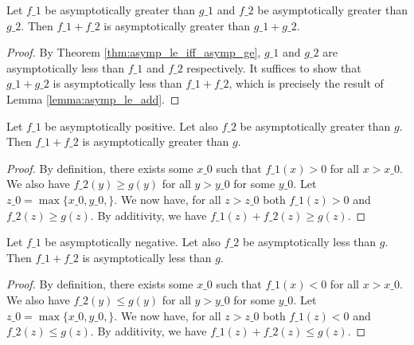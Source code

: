 \begin{lemma}
    \label{lemma:asymp_ge_add}
    \leanok
    Let $f\_1$ be asymptotically greater than $g\_1$ and $f\_2$ be asymptotically greater
    than $g\_2$. Then $f\_1 + f\_2$ is asymptotically greater than $g\_1 + g\_2$.
\end{lemma}

\begin{proof}
    \leanok
    By Theorem \ref{thm:asymp_le_iff_asymp_ge}, $g\_1$ and $g\_2$ are asymptotically less 
    than $f\_1$ and $f\_2$ respectively. It suffices to show that $g\_1 + g\_2$ is
    asymptotically less than $f\_1 + f\_2$, which is precisely the result of
    Lemma \ref{lemma:asymp_le_add}.
\end{proof}

\begin{lemma}
    \label{lemma:asymp_ge_add_pos}
    \leanok
    Let $f\_1$ be asymptotically positive. Let also $f\_2$ be asymptotically greater 
    than $g$. Then $f\_1 + f\_2$ is asymptotically greater than $g$.
\end{lemma}

\begin{proof}
    \leanok
    By definition, there exists some $x\_0$ such that $f\_1(x) > 0$ for all $x > x\_0$.
    We also have $f\_2(y) \ge g(y)$ for all $y > y\_0$ for some $y\_0$. Let
    $z\_0 = \max \{ x\_0, y\_0, \}$. We now have, for all $z > z\_0$ both $f\_1(z) > 0$
    and $f\_2(z) \ge g(z)$. By additivity, we have $f\_1(z) + f\_2(z) \ge g(z)$. 
\end{proof}

\begin{lemma}
    \label{lemma:asymp_le_add_neg}
    \leanok
    Let $f\_1$ be asymptotically negative. Let also $f\_2$ be asymptotically less 
    than $g$. Then $f\_1 + f\_2$ is asymptotically less than $g$.
\end{lemma}

\begin{proof}
    \leanok
    By definition, there exists some $x\_0$ such that $f\_1(x) < 0$ for all $x > x\_0$.
    We also have $f\_2(y) \le g(y)$ for all $y > y\_0$ for some $y\_0$. Let
    $z\_0 = \max \{ x\_0, y\_0, \}$. We now have, for all $z > z\_0$ both $f\_1(z) < 0$
    and $f\_2(z) \le g(z)$. By additivity, we have $f\_1(z) + f\_2(z) \le g(z)$. 
\end{proof}


